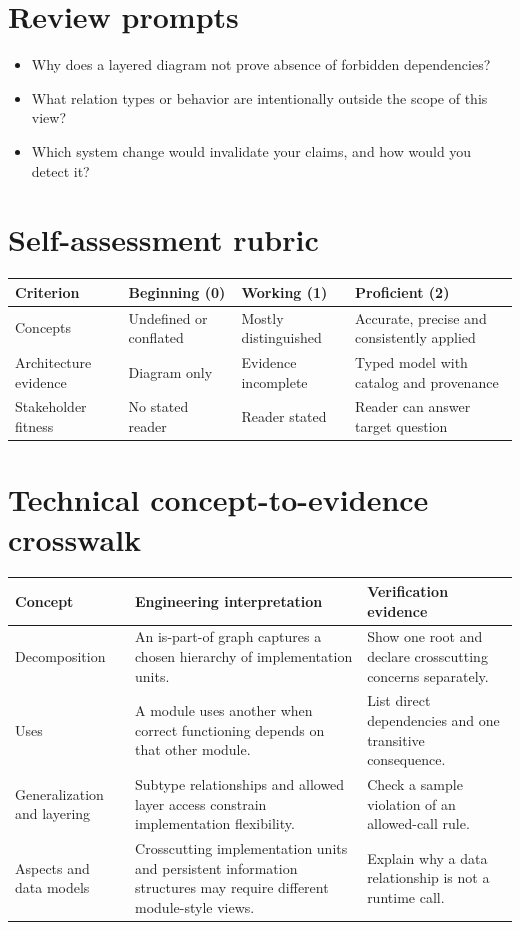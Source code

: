 \documentclass[10pt,letterpaper]{article}
\begin{document}
\section{Review prompts}
\begin{itemize}
\item Why does a layered diagram not prove absence of forbidden dependencies?
\item What relation types or behavior are intentionally outside the scope of this view?
\item Which system change would invalidate your claims, and how would you detect it?
\end{itemize}
\section{Self-assessment rubric}
\small
\begin{tabularx}{\linewidth}{@{}YYYY@{}}
\toprule
\textbf{Criterion} & \textbf{Beginning (0)} & \textbf{Working (1)} & \textbf{Proficient (2)} \\
\midrule
Concepts & Undefined or conflated & Mostly distinguished & Accurate, precise and consistently applied \\
Architecture evidence & Diagram only & Evidence incomplete & Typed model with catalog and provenance \\
Stakeholder fitness & No stated reader & Reader stated & Reader can answer target question \\
\bottomrule
\end{tabularx}
\normalsize
\section{Technical concept-to-evidence crosswalk}
\small
\begin{tabularx}{\linewidth}{@{}YYY@{}}
\toprule
\textbf{Concept} & \textbf{Engineering interpretation} & \textbf{Verification evidence} \\
\midrule
Decomposition & An is-part-of graph captures a chosen hierarchy of implementation units. & Show one root and declare crosscutting concerns separately. \\
Uses & A module uses another when correct functioning depends on that other module. & List direct dependencies and one transitive consequence. \\
Generalization and layering & Subtype relationships and allowed layer access constrain implementation flexibility. & Check a sample violation of an allowed-call rule. \\
Aspects and data models & Crosscutting implementation units and persistent information structures may require different module-style views. & Explain why a data relationship is not a runtime call. \\
\bottomrule
\end{tabularx}
\normalsize
\end{document}

